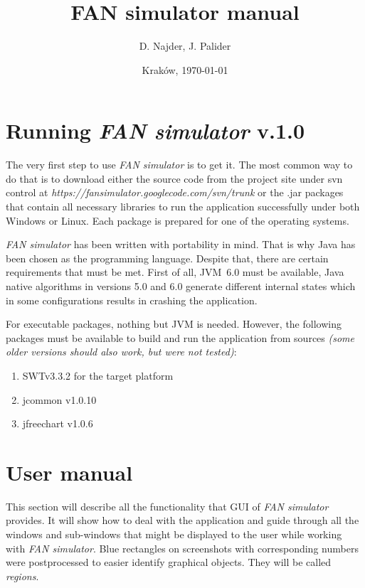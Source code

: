 \documentclass[a4paper,12pt]{article}
\title{FAN simulator manual}
\author{D. Najder, J. Palider}
\date{Krak\'ow, \today}
\begin{document}
	\maketitle

	\newpage
	
	\section{Running \emph{FAN simulator} v.1.0}
	
	The very first step to use \emph{FAN simulator} is to get it. The most common
	way to do that is to download either the source code from the project site
	under svn control at \emph{https://fansimulator.googlecode.com/svn/trunk} or the
	.jar packages that contain all necessary libraries to run the application
	successfully under both Windows or Linux. Each package is prepared for one of
	the operating systems.	
	
	\emph{FAN simulator} has been written with portability in mind. That is why
	Java has been chosen as the programming language. Despite that, there are
	certain requirements that must be met. First of all, JVM~6.0 must be available, Java
	native algorithms in versions 5.0 and 6.0 generate different internal states
	which in some configurations results in crashing the application.

	For executable packages, nothing but JVM is needed. However, the following
	packages must be available to build and run the application from sources
	\emph{(some older versions should also work, but were not tested)}:
	\begin{enumerate}
	\item {SWTv3.3.2 for the target platform}
	\item {jcommon v1.0.10}
	\item {jfreechart v1.0.6}
	\end{enumerate}
	
	
	\section{User manual}
	This section will describe all the functionality that GUI of \emph{FAN
	simulator} provides. It will show how to deal with the application and guide
	through all the windows and sub-windows that might be displayed to the user
	while working with \emph{FAN simulator}.
	Blue rectangles on screenshots with corresponding numbers were postprocessed
	to easier identify graphical objects. They will be called \emph{regions}.
\end{document}
